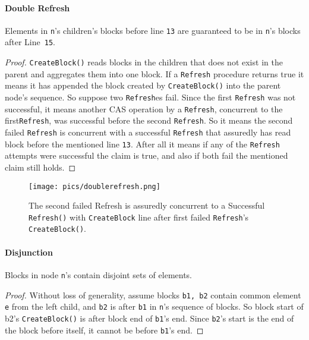 \documentclass[10pt]{article}
\theoremstyle{definition}
\begin{document}


\paragraph{Double Refresh}
Elements in \texttt{n}'s children's blocks before line \texttt{13} are guaranteed to be in \texttt{n}'s blocks after Line~\texttt{15}.
\begin{proof}
\texttt{CreateBlock()} reads blocks in the children that does not exist in the parent and aggregates them into one block. If a \texttt{Refresh} procedure returns true it means it has appended the block created by \texttt{CreateBlock()} into the parent node's sequence. So suppose two \texttt{Refresh}es fail. Since the first \texttt{Refresh} was not successful, it means another CAS operation by a \texttt{Refresh}, concurrent to the first\texttt{Refresh}, was successful before the second \texttt{Refresh}. So it means the second failed \texttt{Refresh} is concurrent with a successful \texttt{Refresh} that assuredly has read block before the mentioned line \texttt{13}. After all it means if any of the \texttt{Refresh} attempts were successful the claim is true, and also if both fail the mentioned claim still holds.
\end{proof}
\begin{figure}[hbt]
  \center\texttt{[image: pics/doublerefresh.png]}
  \caption{The second failed Refresh is assuredly concurrent to a Successful \texttt{Refresh()} with \texttt{CreateBlock} line after first failed \texttt{Refresh}'s \texttt{CreateBlock()}.}
\end{figure}


\paragraph{Disjunction} Blocks in node \texttt{n}'s contain disjoint sets of elements.
\begin{proof}
Without loss of generality, assume blocks \texttt{b1, b2} contain common element \texttt{e} from the left child, and \texttt{b2} is after \texttt{b1} in \texttt{n}'s sequence of blocks. So block start of b2's \texttt{CreateBlock()} is after block end of \texttt{b1}'s end. Since \texttt{b2}'s start is the end of the block before itself, it cannot be before \texttt{b1}'s end.
\end{proof}
\end{document}
